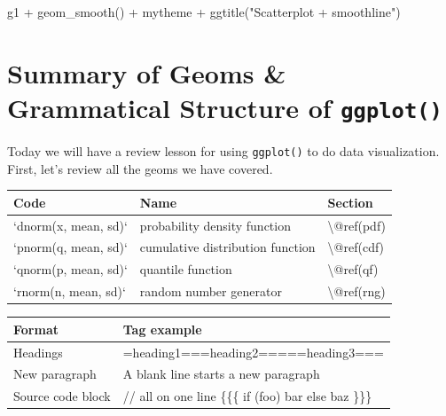 \documentclass[
]{book}
\newenvironment{Shaded}{\begin{snugshade}}{\end{snugshade}}
\newcommand{\FunctionTok}[1]{\textcolor[rgb]{0.00,0.00,0.00}{#1}}
\newcommand{\NormalTok}[1]{#1}
\newcommand{\SpecialCharTok}[1]{\textcolor[rgb]{0.00,0.00,0.00}{#1}}
\newcommand{\StringTok}[1]{\textcolor[rgb]{0.31,0.60,0.02}{#1}}
\begin{document}
\begin{Shaded}
\begin{Highlighting}[]
\NormalTok{g1 }\SpecialCharTok{+} \FunctionTok{geom\_smooth}\NormalTok{() }\SpecialCharTok{+}\NormalTok{ mytheme }\SpecialCharTok{+} 
  \FunctionTok{ggtitle}\NormalTok{(}\StringTok{"Scatterplot + smoothline"}\NormalTok{) }
\end{Highlighting}
\end{Shaded}

\hypertarget{summary-geom}{%
\section{\texorpdfstring{Summary of Geoms \& Grammatical Structure of \texttt{ggplot()}}{Summary of Geoms \& Grammatical Structure of ggplot()}}\label{summary-geom}}

Today we will have a review lesson for using \texttt{ggplot()} to do data visualization. First, let's review all the geoms we have covered.

\begin{tabular}{l|l|l}
\hline
Code & Name & Section\\
\hline
`dnorm(x, mean, sd)` & probability density function & \textbackslash{}@ref(pdf)\\
\hline
`pnorm(q, mean, sd)` & cumulative distribution function & \textbackslash{}@ref(cdf)\\
\hline
`qnorm(p, mean, sd)` & quantile function & \textbackslash{}@ref(qf)\\
\hline
`rnorm(n, mean, sd)` & random number generator & \textbackslash{}@ref(rng)\\
\hline
\end{tabular}

\begin{longtable}[]{@{}ll@{}}
\toprule
Format & Tag example \\
\midrule
\endhead
Headings & =heading1===heading2=====heading3=== \\
New paragraph & A blank line starts a new paragraph \\
Source code block & // all on one line \{\{\{ if (foo) bar else baz \}\}\} \\
\bottomrule
\end{longtable}
\end{document}
